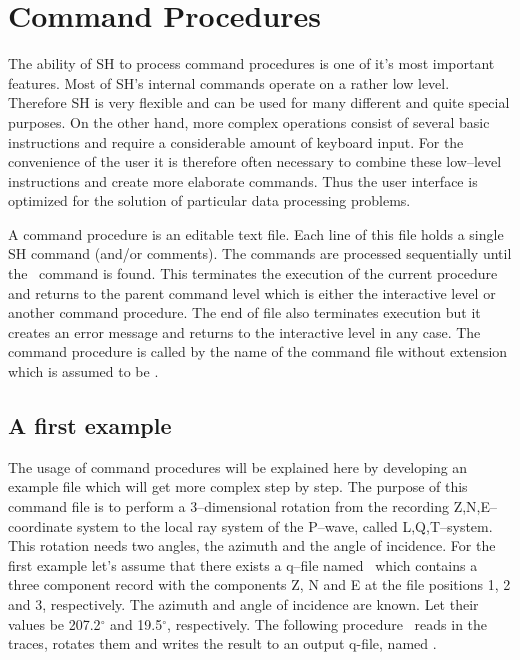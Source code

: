 \section{Command Procedures}
\label{sec:CmdProc}

The ability of SH to process command procedures is one of it's
most important features.  Most of SH's internal commands
operate on a rather low level.  Therefore SH is very flexible
and can be used for many different and quite special purposes.
On the other hand, more complex operations consist of several
basic instructions and require a considerable amount of keyboard
input.  For the convenience of the user it is therefore often
necessary to combine these low--level instructions and create
more elaborate commands.  Thus the user interface is optimized
for the solution of particular data processing problems.

A command procedure is an editable text file.  Each line of
this file holds a single SH command (and/or comments).  The
commands are processed sequentially until the \
command is found.  This terminates the execution of the current
procedure and returns to the parent command level which is either
the interactive level or another command procedure.  The end of
file also terminates execution but it creates an error message
and returns to the interactive level in any case.  The command
procedure is called by the name of the command file without
extension which is assumed to be .

\subsection{A first example}

The usage of command procedures will be explained here by
developing an example file which will get more complex step
by step.  The purpose of this command file is to perform a
3--dimensional rotation from the recording Z,N,E--coordinate system
to the local ray system of the P--wave, called L,Q,T--system.
This rotation needs two angles, the azimuth and the angle of
incidence.  For the first example let's assume that there exists
a q--file named \exm{q\_exm}\ which contains a three component
record with the components Z, N and E at the file positions 1, 2
and 3, respectively.  The azimuth and angle of incidence are
known.  Let their values be 207.2$^\circ$ and 19.5$^\circ$,
respectively.  The following procedure \ reads in the
traces, rotates them and writes the result to an output q-file,
named .


